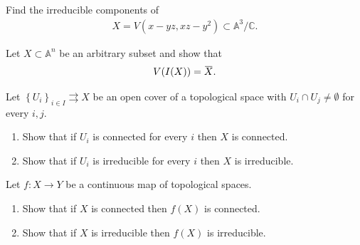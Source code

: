 \begin{exercise}[Gathmann 2.17]

Find the irreducible components of
\begin{align*}  
X = V(x - yz, xz - y^2) \subset {\mathbb{A}}^3/{\mathbb{C}}
.\end{align*}

\end{exercise}

\begin{exercise}[Gathmann 2.18]

Let \(X\subset {\mathbb{A}}^n\) be an arbitrary subset and show that
\begin{align*}  
V(I(X)) = \mkern 1.5mu\overline{\mkern-1.5muX\mkern-1.5mu}\mkern 1.5mu
.\end{align*}

\end{exercise}

\begin{exercise}[Gathmann 2.21]

Let \(\left\{{U_i}\right\}_{i\in I} \rightrightarrows X\) be an open
cover of a topological space with \(U_i \cap U_j \neq \emptyset\) for
every \(i, j\).

\begin{enumerate}
\def\labelenumi{\alph{enumi}.}
\item
  Show that if \(U_i\) is connected for every \(i\) then \(X\) is
  connected.
\item
  Show that if \(U_i\) is irreducible for every \(i\) then \(X\) is
  irreducible.
\end{enumerate}

\end{exercise}

\begin{exercise}[Gathmann 2.22]

Let \(f:X\to Y\) be a continuous map of topological spaces.

\begin{enumerate}
\def\labelenumi{\alph{enumi}.}
\item
  Show that if \(X\) is connected then \(f(X)\) is connected.
\item
  Show that if \(X\) is irreducible then \(f(X)\) is irreducible.
\end{enumerate}

\end{exercise}


